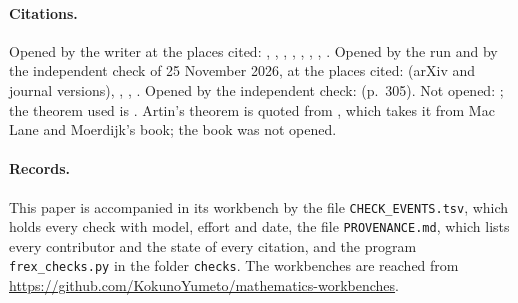 \documentclass[11pt,a4paper]{article}
\theoremstyle{definition}
\begin{document}
\paragraph{Citations.} Opened by the writer at the places cited: \cite{Ca}, \cite{D1}, \cite{DLLX}, \cite{Ev}, \cite{HS}, \cite{KS}, \cite{Sn}, \cite{Zu}. Opened by the run and by the independent check of 25 November 2026, at the places cited: \cite{Bo} (arXiv and journal versions), \cite{HN}, \cite{IM}, \cite{KPT}. Opened by the independent check: \cite{vN} (p.~305). Not opened: \cite{Ho}; the theorem used is \cite[Theorem~2.2]{KPT}. Artin's theorem is quoted from \cite[Theorem~5.1]{DLLX}, which takes it from Mac Lane and Moerdijk's book; the book was not opened.

\paragraph{Records.} This paper is accompanied in its workbench by the file
\texttt{CHECK\_EVENTS.tsv}, which holds every check with model, effort and
date, the file \texttt{PROVENANCE.md}, which lists every contributor and
the state of every citation, and the program \texttt{frex\_checks.py} in
the folder \texttt{checks}. The workbenches are reached from
\url{https://github.com/KokunoYumeto/mathematics-workbenches}.
\end{document}
